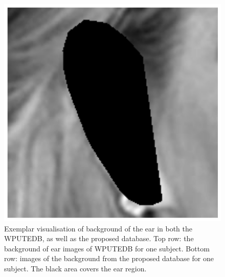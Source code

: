 \begin{figure}[!t]
    \includegraphics[height=\flowh]{resources/Ear_Deformable_Model/verification/background_exp/ear_bg_5}
    \caption{Exemplar visualisation of background of the ear in both the WPUTEDB, as well as the proposed database. Top row: the background of ear images of WPUTEDB for one subject. Bottom row: images of the background from the proposed database for one subject. The black area covers the ear region.}
    \label{fig:bg_exp}
\end{figure}



